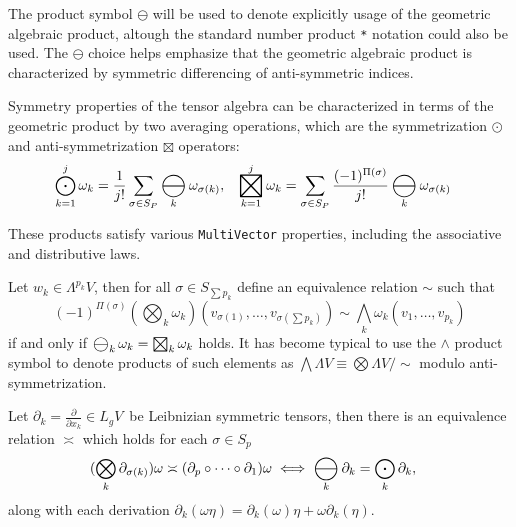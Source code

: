 \documentclass{juliacon}
\DeclareMathOperator*{\bigboxtimes}{\scalerel*{\boxtimes}{\bigodot}}
\DeclareMathOperator*{\bigominus}{\scalerel*{\ominus}{\bigodot}}
\begin{document}
\begin{remark}
	The product symbol $\ominus$ will be used to denote explicitly usage of the geometric algebraic product, altough the standard number product \verb`*` notation could also be used.
	The $\ominus$ choice helps emphasize that the geometric algebraic product is characterized by symmetric differencing of anti-symmetric indices.
\end{remark}

\begin{definition}
	Symmetry properties of the tensor algebra can be characterized in terms of the geometric product by two averaging operations, which are the symmetrization $\odot$ and anti-symmetrization $\boxtimes$ operators:
	\begin{align*}
		\bigodot_{k=1}^j \omega_k &= \frac1{j!}\sum_{\sigma\in S_P}\bigominus_k\omega_{\sigma(k)}, &
		\bigboxtimes_{k=1}^j \omega_k &= \sum_{\sigma\in S_P}\frac{(-1)^{\Pi(\sigma)}}{j!}\bigominus_k\omega_{\sigma(k)}
	\end{align*}
\end{definition}
These products satisfy various \verb`MultiVector` properties, including the associative and distributive laws.

\begin{definition}
	Let $w_k\in\Lambda^{p_k}V$, then for all $\sigma\in S_{\sum p_k}$ define an equivalence relation $\sim$ such that
	$$ (-1)^{\Pi(\sigma)}(\bigotimes_k \omega_k)(v_{\sigma(1)},\dots,v_{\sigma(\sum p_k)}) \sim \bigwedge_k \omega_k(v_{1},\dots,v_{p_k}) $$
	if and only if $ \bigominus_k\omega_k = \bigboxtimes_k\omega_k$ holds.
	It has become typical to use the $\wedge$ product symbol to denote products of such elements as $\bigwedge\Lambda V \equiv \bigotimes\Lambda V/\sim$ modulo anti-symmetrization.
\end{definition}

\begin{definition}
	Let $\partial_k = \frac\partial{\partial x_k}\in L_gV\,$ be Leibnizian symmetric tensors, then there is an equivalence relation $\asymp$ which holds for each $\sigma\in S_p$
	\begin{align*}
		(\bigotimes_k \partial_{\sigma(k)})\omega &\asymp (\partial_p \circ \dots\circ  \partial_1)\omega \iff \bigominus_k\partial_k = \bigodot_k\partial_k,
	\end{align*}
	along with each derivation $\partial_k(\omega\eta) = \partial_k(\omega)\eta + \omega\partial_k(\eta)$.
\end{definition}
\end{document}
